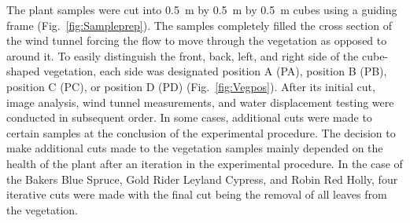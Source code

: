 \documentclass[12pt]{article}
\begin{document}
The plant samples were cut into 0.5~\si{m} by 0.5~\si{m} by 0.5~\si{m} cubes using a guiding frame  (Fig.~\ref{fig:Sampleprep}). The samples completely filled the cross section of the wind tunnel forcing the flow to move through the vegetation as opposed to around it. To easily distinguish the front, back, left, and right side of the cube-shaped vegetation, each side was designated position A (PA), position B (PB), position C (PC), or position D (PD) (Fig.~\ref{fig:Vegpos}). After its initial cut, image analysis, wind tunnel measurements, and water displacement testing were conducted in subsequent order. In some cases, additional cuts were made to certain samples at the conclusion of the experimental procedure. The decision to make additional cuts made to the vegetation samples mainly depended on the health of the plant after an iteration in the experimental procedure. In the case of the Bakers Blue Spruce, Gold Rider Leyland Cypress, and Robin Red Holly, four iterative cuts were made with the final cut being the removal of all leaves from the vegetation.
\end{document}
